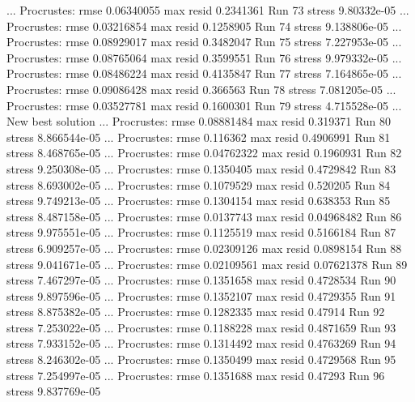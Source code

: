 \documentclass[
]{book}
\newenvironment{Shaded}{\begin{snugshade}}{\end{snugshade}}
\newcommand{\NormalTok}[1]{#1}
\begin{document}
\begin{Shaded}
\begin{Highlighting}[]
\NormalTok{... Procrustes: rmse 0.06340055  max resid 0.2341361 }
\NormalTok{Run 73 stress 9.80332e{-}05 }
\NormalTok{... Procrustes: rmse 0.03216854  max resid 0.1258905 }
\NormalTok{Run 74 stress 9.138806e{-}05 }
\NormalTok{... Procrustes: rmse 0.08929017  max resid 0.3482047 }
\NormalTok{Run 75 stress 7.227953e{-}05 }
\NormalTok{... Procrustes: rmse 0.08765064  max resid 0.3599551 }
\NormalTok{Run 76 stress 9.979332e{-}05 }
\NormalTok{... Procrustes: rmse 0.08486224  max resid 0.4135847 }
\NormalTok{Run 77 stress 7.164865e{-}05 }
\NormalTok{... Procrustes: rmse 0.09086428  max resid 0.366563 }
\NormalTok{Run 78 stress 7.081205e{-}05 }
\NormalTok{... Procrustes: rmse 0.03527781  max resid 0.1600301 }
\NormalTok{Run 79 stress 4.715528e{-}05 }
\NormalTok{... New best solution}
\NormalTok{... Procrustes: rmse 0.08881484  max resid 0.319371 }
\NormalTok{Run 80 stress 8.866544e{-}05 }
\NormalTok{... Procrustes: rmse 0.116362  max resid 0.4906991 }
\NormalTok{Run 81 stress 8.468765e{-}05 }
\NormalTok{... Procrustes: rmse 0.04762322  max resid 0.1960931 }
\NormalTok{Run 82 stress 9.250308e{-}05 }
\NormalTok{... Procrustes: rmse 0.1350405  max resid 0.4729842 }
\NormalTok{Run 83 stress 8.693002e{-}05 }
\NormalTok{... Procrustes: rmse 0.1079529  max resid 0.520205 }
\NormalTok{Run 84 stress 9.749213e{-}05 }
\NormalTok{... Procrustes: rmse 0.1304154  max resid 0.638353 }
\NormalTok{Run 85 stress 8.487158e{-}05 }
\NormalTok{... Procrustes: rmse 0.0137743  max resid 0.04968482 }
\NormalTok{Run 86 stress 9.975551e{-}05 }
\NormalTok{... Procrustes: rmse 0.1125519  max resid 0.5166184 }
\NormalTok{Run 87 stress 6.909257e{-}05 }
\NormalTok{... Procrustes: rmse 0.02309126  max resid 0.0898154 }
\NormalTok{Run 88 stress 9.041671e{-}05 }
\NormalTok{... Procrustes: rmse 0.02109561  max resid 0.07621378 }
\NormalTok{Run 89 stress 7.467297e{-}05 }
\NormalTok{... Procrustes: rmse 0.1351658  max resid 0.4728534 }
\NormalTok{Run 90 stress 9.897596e{-}05 }
\NormalTok{... Procrustes: rmse 0.1352107  max resid 0.4729355 }
\NormalTok{Run 91 stress 8.875382e{-}05 }
\NormalTok{... Procrustes: rmse 0.1282335  max resid 0.47914 }
\NormalTok{Run 92 stress 7.253022e{-}05 }
\NormalTok{... Procrustes: rmse 0.1188228  max resid 0.4871659 }
\NormalTok{Run 93 stress 7.933152e{-}05 }
\NormalTok{... Procrustes: rmse 0.1314492  max resid 0.4763269 }
\NormalTok{Run 94 stress 8.246302e{-}05 }
\NormalTok{... Procrustes: rmse 0.1350499  max resid 0.4729568 }
\NormalTok{Run 95 stress 7.254997e{-}05 }
\NormalTok{... Procrustes: rmse 0.1351688  max resid 0.47293 }
\NormalTok{Run 96 stress 9.837769e{-}05 }

\end{Highlighting}
\end{Shaded}
\end{document}
